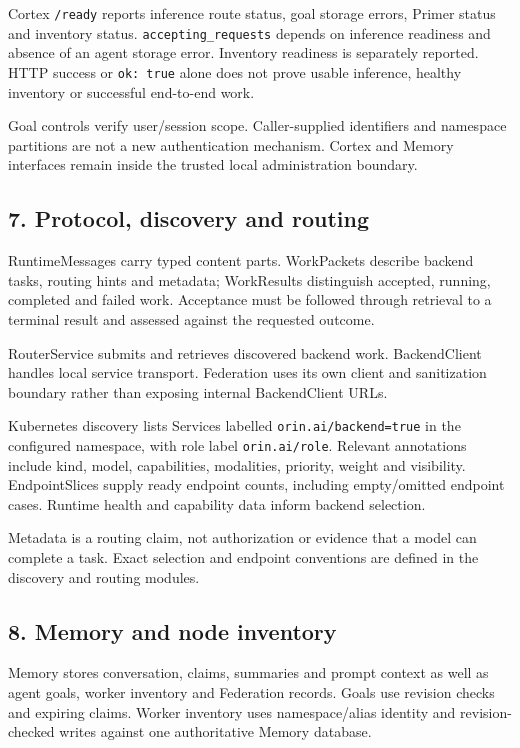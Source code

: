 \documentclass[
  10pt,
]{article}
\begin{document}
Cortex \texttt{/ready} reports inference route status, goal storage
errors, Primer status and inventory status. \texttt{accepting\_requests}
depends on inference readiness and absence of an agent storage error.
Inventory readiness is separately reported. HTTP success or
\texttt{ok:\ true} alone does not prove usable inference, healthy
inventory or successful end-to-end work.

Goal controls verify user/session scope. Caller-supplied identifiers and
namespace partitions are not a new authentication mechanism. Cortex and
Memory interfaces remain inside the trusted local administration
boundary.

\hypertarget{protocol-discovery-and-routing}{%
\subsection{7. Protocol, discovery and
routing}\label{protocol-discovery-and-routing}}

RuntimeMessages carry typed content parts. WorkPackets describe backend
tasks, routing hints and metadata; WorkResults distinguish accepted,
running, completed and failed work. Acceptance must be followed through
retrieval to a terminal result and assessed against the requested
outcome.

RouterService submits and retrieves discovered backend work.
BackendClient handles local service transport. Federation uses its own
client and sanitization boundary rather than exposing internal
BackendClient URLs.

Kubernetes discovery lists Services labelled
\texttt{orin.ai/backend=true} in the configured namespace, with role
label \texttt{orin.ai/role}. Relevant annotations include kind, model,
capabilities, modalities, priority, weight and visibility.
EndpointSlices supply ready endpoint counts, including empty/omitted
endpoint cases. Runtime health and capability data inform backend
selection.

Metadata is a routing claim, not authorization or evidence that a model
can complete a task. Exact selection and endpoint conventions are
defined in the discovery and routing modules.

\hypertarget{memory-and-node-inventory}{%
\subsection{8. Memory and node
inventory}\label{memory-and-node-inventory}}

Memory stores conversation, claims, summaries and prompt context as well
as agent goals, worker inventory and Federation records. Goals use
revision checks and expiring claims. Worker inventory uses
namespace/alias identity and revision-checked writes against one
authoritative Memory database.
\end{document}
